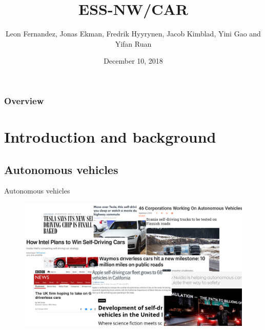 \documentclass{beamer}
\title[ESS-NW/CAR]{ESS-NW/CAR } %
\author{ Leon Fernandez, Jonas Ekman, Fredrik Hyyrynen, Jacob Kimblad, Yini Gao and  Yifan Ruan} %
\institute[KTH] %
{
    MF2063 \\ %
    \medskip

}
\date{December 10, 2018} %
\begin{document}
\begin{frame}
    \titlepage %
\end{frame}

\begin{frame}
    \frametitle{Overview} %
    \tableofcontents %
\end{frame}


\section{Introduction and background} 
\subsection{Autonomous vehicles}
\begin{frame}{Autonomous vehicles}
    \begin{figure}
        \includegraphics[width=1.1\linewidth]{articles.jpg}
    \end{figure}
\end{frame}
\end{document}
